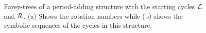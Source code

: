 \begin{figure}
{	}
	\quad
	\caption[Farey-trees of a period-adding structure between $\L$ and $\R$]{
		Farey-trees of a period-adding structure with the starting cycles $\L$ and $\R$.
		(a) Shows the rotation numbers while (b) shows the symbolic sequences of the cycles in this structure.
	}
	\label{fig:state.discont.adding.farey}
\end{figure}
